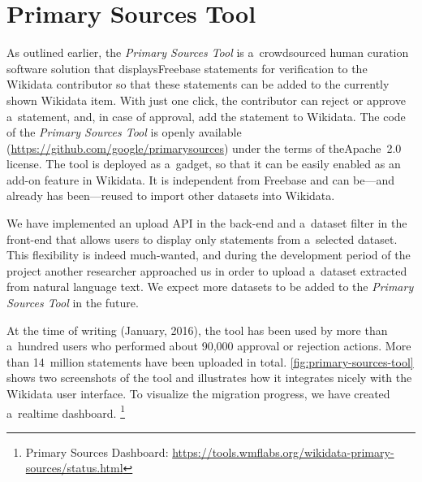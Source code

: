 \documentclass{sig-alternate-2013}
\begin{document}
\section{Primary Sources Tool}\label{sec:primary-sources-tool}

As outlined earlier, the \emph{Primary Sources Tool} is a~crowdsourced human curation
software solution that displays\linebreak Freebase statements for verification to the Wikidata contributor
so that these statements can be added to the currently shown Wikidata item.
With just one click, the contributor can reject or approve a~statement,
and, in case of approval, add the statement to Wikidata.
The code of the \emph{Primary Sources Tool} is openly available (\url{https://github.com/google/primarysources})
under the terms of the\linebreak Apache~2.0 license.
The tool is deployed as a~gadget,
so that it can be easily enabled as an add-on feature in Wikidata.
It is independent from Freebase and can be---and already has been---reused to import other datasets into Wikidata.

We have implemented an upload API in the back-end
and a~dataset filter in the front-end that allows users
to display only statements from a~selected dataset.
This flexibility is indeed much-wanted, and during the development period of the project
another researcher approached us in order to upload
a~dataset extracted from natural language text.
We expect more datasets to be added to the \emph{Primary Sources Tool} in the future.

At the time of writing (January, 2016), the tool has been used by more than a~hundred users
who performed about 90,000 approval or rejection actions.
More than 14~million statements have been uploaded in total.
\autoref{fig:primary-sources-tool} shows two screenshots
of the tool and illustrates how it integrates nicely with the Wikidata user interface.
To visualize the migration progress, we have created a~realtime dashboard.%
\footnote{Primary Sources Dashboard:
\url{https://tools.wmflabs.org/wikidata-primary-sources/status.html}}
\end{document}
